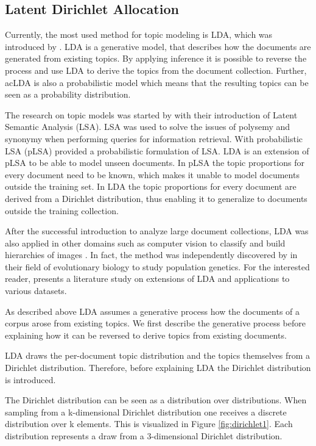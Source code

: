 \subsection{Latent Dirichlet Allocation}
Currently, the most used method for topic modeling is \acl{LDA}, which was introduced by \cite{Blei2003}. \ac{LDA} is a generative model, that describes how the documents are generated from existing topics. By applying inference it is possible to reverse the process and use \ac{LDA} to derive the topics from the document collection. Further, \\ac{LDA} is also a probabilistic model which means that the resulting topics can be seen as a probability distribution.

The research on topic models was started by \cite{Deerwester1990} with their introduction of Latent Semantic Analysis (LSA). LSA was used to solve the issues of polysemy and synonymy when performing queries for information retrieval. With probabilistic LSA (pLSA) \cite{Hofmann1999} provided a probabilistic formulation of LSA. \ac{LDA} is an extension of pLSA to be able to model unseen documents. In pLSA the topic proportions for every document need to be known, which makes it unable to model documents outside the training set. In LDA the topic proportions for every document are derived from a Dirichlet distribution, thus enabling it to generalize to documents outside the training collection.

After the successful introduction to analyze large document collections, LDA was also applied in other domains such as computer vision to classify \citep{Fei-Fei2005} and build hierarchies of images \citep{Li2010}. In fact, the method was independently discovered by \cite{Pritchard2000} in their field of evolutionary biology to study population genetics. For the interested reader, \cite{Jelodar2017} presents a literature study on extensions of LDA and applications to various datasets.

As described above LDA assumes a generative process how the documents of a corpus arose from existing topics. We first describe the generative process before explaining how it can be reversed to derive topics from existing documents.

LDA draws the per-document topic distribution and the topics themselves from a  Dirichlet distribution. Therefore, before explaining LDA the Dirichlet distribution is introduced. 

The Dirichlet distribution can be seen as a distribution over distributions. When sampling from a k-dimensional Dirichlet distribution one receives a discrete distribution over k elements. This is visualized in Figure \ref{fig:dirichlet1}. Each distribution represents a draw from a 3-dimensional Dirichlet distribution.

